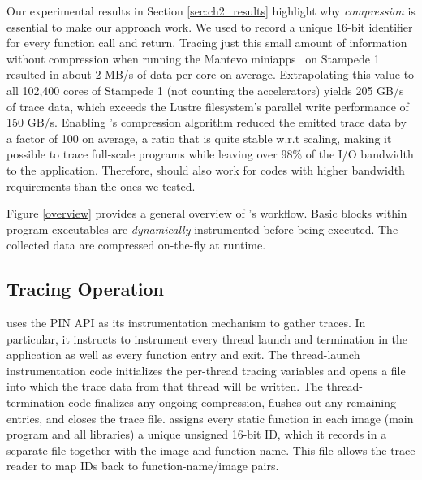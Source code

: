Our experimental results in Section \ref{sec:ch2_results} highlight why \textit{compression} is essential to make our approach work.
%
We used \parlot to record a unique 16-bit identifier for every function call and return.
%
Tracing just this small amount of information without compression when running the Mantevo miniapps~\cite{mantevo} on Stampede 1 resulted in about 2 MB/s of data per core on average.
%
Extrapolating this value to all 102,400 cores of Stampede 1 (not counting the accelerators) yields 205 GB/s of trace data, which exceeds the Lustre filesystem's parallel write performance of 150 GB/s.
%
Enabling \parlot's compression algorithm reduced the emitted trace data by a factor of 100 on average, a ratio that is quite stable w.r.t scaling, making it possible to trace full-scale programs while leaving over 98\% of the I/O bandwidth to the application. Therefore, \parlot should also work for codes with higher bandwidth requirements than the ones we tested.

Figure \ref{overview} provides a general overview of \parlot 's workflow.
%
Basic blocks within program executables are {\em dynamically} instrumented before being executed. The collected data are compressed on-the-fly at runtime.
%

\subsection{Tracing Operation}
\label{subsec:traceOp}

\parlot uses the PIN API as its instrumentation mechanism to gather traces. In particular, it instructs \pin to instrument every thread launch and termination in the application as well as every function entry and exit. The thread-launch instrumentation code initializes the per-thread tracing variables and opens a file into which the trace data from that thread will be written. The thread-termination code finalizes any ongoing compression, flushes out any remaining entries, and closes the trace file. \parlot assigns every static function in each image (main program and all libraries) a unique unsigned 16-bit ID, which it records in a separate file together with the image and function name. This file allows the trace reader to map IDs back to function-name/image pairs.

